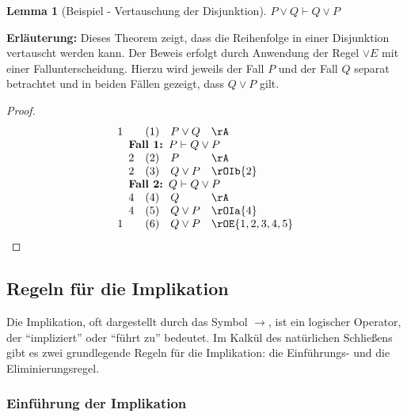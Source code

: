 \documentclass{book}
\theoremstyle{plain}
\newtheorem*{lemma}{Lemma} %
\theoremstyle{remark}
\theoremstyle{definition}
\begin{document}
\begin{lemma}[Beispiel - Vertauschung der Disjunktion]
\( P \lor Q \vdash Q \lor P \)
\end{lemma}

\textbf{Erläuterung:} Dieses Theorem zeigt, dass die Reihenfolge in einer Disjunktion vertauscht werden kann. Der Beweis erfolgt durch Anwendung der Regel \(\lor E\) mit einer Fallunterscheidung. Hierzu wird jeweils der Fall \(P\) und der Fall \(Q\) separat betrachtet und in beiden Fällen gezeigt, dass \(Q \lor P\) gilt.

\begin{proof}
\[
\begin{array}{l l l l}
    1 & (1) & P \lor Q & \rA \\
    \multicolumn{4}{l}{\quad \textbf{Fall 1: \(P\vdash Q\lor P\) } } \\
    \quad 2 & (2) & P & \rA \\
    \quad 2 & (3) & Q \lor P & \rOIb{2} \\
    \multicolumn{4}{l}{\quad \textbf{Fall 2: \(Q\vdash Q\lor P\) }} \\
    \quad 4 & (4) & Q & \rA \\
    \quad 4 & (5) & Q \lor P & \rOIa{4} \\
    1 & (6) & Q \lor P & \rOE{1,2,3,4,5} \\
\end{array}
\]
\end{proof}

\subsection{Regeln für die Implikation}

Die Implikation, oft dargestellt durch das Symbol \(\rightarrow\), ist ein logischer Operator, der \enquote{impliziert} oder \enquote{führt zu} bedeutet. Im Kalkül des natürlichen Schließens gibt es zwei grundlegende Regeln für die Implikation: die Einführungs- und die Eliminierungsregel.

\subsubsection{Einführung der Implikation}
\label{rule:RI}
\end{document}
